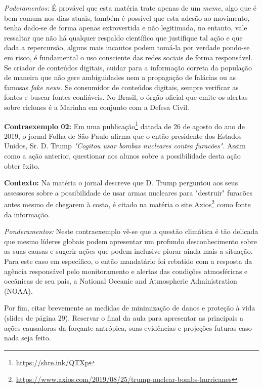 \documentclass[
12pt,				%
openright,			%
oneside,			%
a4paper,			%
chapter=TITLE,		%
english,			%
brazil				%
]{abntex2}
\begin{document}
\textit{Poderamentos:} É provável que esta matéria trate apenas de um \textit{meme}, algo que é bem comum nos dias atuais, também é possível que esta adesão ao movimento, tenha dado-se de forma apenas extrovertida e não legitimada, no entanto, vale ressaltar que não há qualquer respaldo científico que justifique tal ação e que dada a repercursão, alguns mais incautos podem tomá-la por verdade pondo-se em risco, é fundamental o uso consciente das redes sociais de forma responsável. Se criador de conteúdos digitais, cuidar para a informação correta da população de maneira que não gere ambiguidades nem a propagação de falácias ou as famosas \textit{fake news}. Se consumidor de conteúdos digitais, sempre verificar as fontes e buscar fontes confiáveis. No Brasil, o órgão oficial que emite os alertas sobre ciclones é a Marinha em conjunto com a Defesa Civil. 

\textbf{Contraexemplo 02:} Em uma publicação\footnote{\url{https://shre.ink/QTXp}} datada de 26 de agosto do ano de 2019, o jornal Folha de São Paulo afirma que o então presidente dos Estados Unidos, Sr. D. Trump \textit{"Cogitou usar bombas nucleares contra furacões"}. Assim como a ação anterior, questionar aos alunos sobre a possibilidade desta ação obter êxito.
\par\textbf{Contexto:} Na matéria o jornal descreve que D. Trump perguntou aos seus assessores sobre a possibilidade de usar armas nucleares para "destruir" furacões antes mesmo de chegarem à costa, é citado na matéria o site Axios\footnote{\url{https://www.axios.com/2019/08/25/trump-nuclear-bombs-hurricanes}} como fonte da informação.

\textit{Ponderamentos:} Neste contraexemplo vê-se que a questão climática é tão delicada que mesmo líderes globais podem apresentar um profundo desconhecimento sobre as suas causas e sugerir ações que podem inclusive piorar ainda mais a situação. Para este caso em específico, o então mandatário foi rebatido com a resposta da agência responsável pelo monitoramento e alertas das condições atmosféricas e oceânicas de seu pais, a National Oceanic and Atmospheric Administration (NOAA).

Por fim, citar brevemente as medidas de minimização de danos e proteção à vida (slides de página 29). Reservar o final da aula para apresentar as principais a ações causadoras da forçante antrópica, suas evidências e projeções futuras caso nada seja feito.
\end{document}
